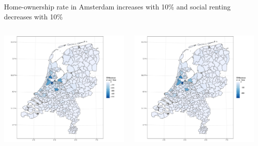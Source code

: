 \documentclass{beamer}
\begin{document}
\begin{frame}{Home-ownership rate in Amsterdam increases with 10\% and social renting decreases with 10\%}
	\begin{columns}
		\begin{column}{0.5\textwidth}
			\begin{center}
				\includegraphics[width=1.1\textwidth]{../../fig/p_diff_out}      
			\end{center}
		\end{column}
		\begin{column}{0.5\textwidth} 	
			\begin{center}
				\includegraphics[width=1.1\textwidth]{../../fig/p_diff_in}      
			\end{center}
		\end{column}
	\end{columns}
\end{frame}
\end{document}
